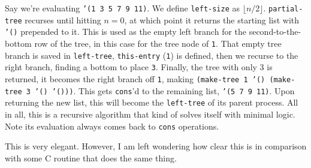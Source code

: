 \documentclass[final,fleqn,titlepage,twoside]{article}
\begin{document}
Say we're evaluating \texttt{'(1 3 5 7 9 11)}. We define
\texttt{left-size} as \(\lfloor n/2 \rfloor\). \texttt{partial-tree} recurses
until hitting \(n=0\), at which point it returns the starting list with
\texttt{'()} prepended to it. This is used as the empty left branch for the
second-to-the-bottom row of the tree, in this case for the tree node of
\texttt{1}. That empty tree branch is saved in \texttt{left-tree},
\texttt{this-entry} (\texttt{1}) is defined, then we recurse to the right
branch, finding a bottom to place \texttt{3}. Finally, the tree with only 3
is returned, it becomes the right branch off \texttt{1}, making
\texttt{(make-tree 1 '() (make-tree 3 '() '()))}. This gets
\texttt{cons}'d to the remaining list, \texttt{'(5 7 9 11)}. Upon
returning the new list, this will become the \texttt{left-tree} of its parent
process. All in all, this is a recursive algorithm that kind of solves itself
with minimal logic. Note its evaluation always comes back to \texttt{cons}
operations.

This is very elegant. However, I am left wondering how clear this is in
comparison with some C routine that does the same thing.
\end{document}
